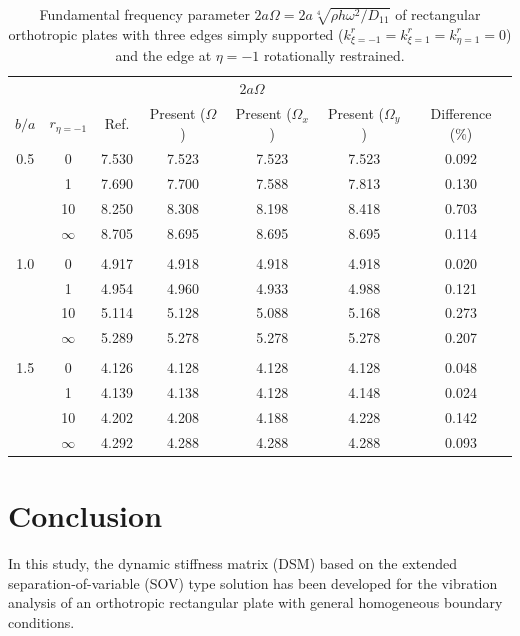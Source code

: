 \documentclass[preprint,12pt]{elsarticle}
\begin{document}
\begin{table}[!htbp]  
	\centering
	\caption{Fundamental frequency parameter $2a\Omega = 2a\sqrt[4]{\rho h \omega^2/D_{11}}$ of rectangular orthotropic plates with three edges simply supported ($k^r_{\xi=-1} = k^r_{\xi=1} = k^r_{\eta=1} = 0$) and the edge at $\eta = -1$ rotationally restrained.}
	\begin{tabular}{c c c c c c c }
		\toprule
		\multicolumn{2}{c}{} & \multicolumn{4}{c}{$2a\Omega$} & \\ 
		\cmidrule(lr){3-7}
		$b/a$ & $r_{\eta=-1}$ & Ref.\Citealp{zhang2019new} & Present ($\Omega$) & Present ($\Omega_x$) & Present ($\Omega_y$) & Difference (\%) \\ 
		\midrule
		0.5 & 0         & 7.530 & 7.523 & 7.523 & 7.523 & 0.092 \\ 
		& 1         & 7.690 & 7.700 & 7.588 & 7.813 & 0.130 \\ 
		& 10        & 8.250 & 8.308 & 8.198 & 8.418 & 0.703 \\ 
		& $\infty$  & 8.705 & 8.695 & 8.695 & 8.695 & 0.114 \\ 
		\\
		1.0 & 0         & 4.917 & 4.918 & 4.918 & 4.918 & 0.020 \\ 
		& 1         & 4.954 & 4.960 & 4.933 & 4.988 & 0.121 \\ 
		& 10        & 5.114 & 5.128 & 5.088 & 5.168 & 0.273 \\ 
		& $\infty$  & 5.289 & 5.278 & 5.278 & 5.278 & 0.207 \\ 
		\\
		1.5 & 0         & 4.126 & 4.128 & 4.128 & 4.128 & 0.048 \\ 
		& 1         & 4.139 & 4.138 & 4.128 & 4.148 & 0.024 \\ 
		& 10        & 4.202 & 4.208 & 4.188 & 4.228 & 0.142 \\ 
		& $\infty$  & 4.292 & 4.288 & 4.288 & 4.288 & 0.093 \\ 
		\bottomrule
	\end{tabular}
	\label{tab:oth2}
\end{table}

\FloatBarrier
\section{Conclusion}
In this study, the dynamic stiffness matrix (DSM) based on the extended separation-of-variable (SOV) type solution has been developed for the vibration analysis of an orthotropic rectangular plate with general homogeneous boundary conditions. 
\end{document}
